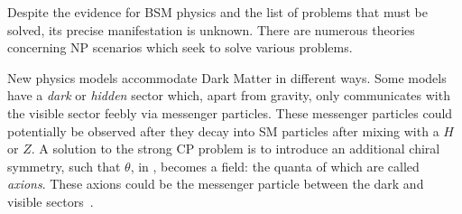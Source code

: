 
Despite the evidence for BSM physics and the list of problems that must be solved, its precise
manifestation is unknown.
There are numerous theories concerning NP scenarios which seek to solve various problems.

New physics models accommodate Dark Matter in different ways.
Some models have a \emph{dark} or \emph{hidden} sector which, apart from gravity, only
communicates with the visible sector feebly via messenger particles.
These messenger particles could potentially be observed after they decay into SM particles after
mixing with a $H$ or $Z$.
A solution to the strong CP problem is to introduce an additional chiral symmetry, such that
$\theta$, in , becomes a field: the quanta of which are called \emph{axions}.
These axions could be the messenger particle between the dark and visible
sectors~\cite{Peccei:2006as}.


